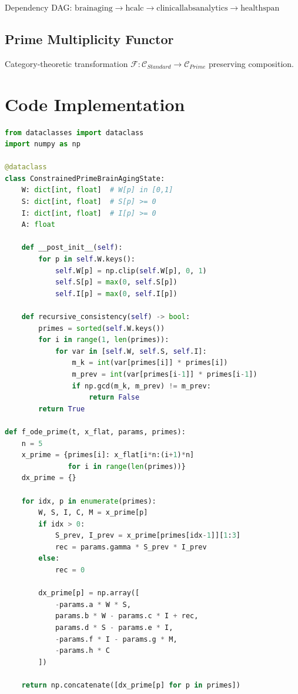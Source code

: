 \documentclass[11pt,letterpaper]{article}
\begin{document}
Dependency DAG: $\text{brainaging} \to \text{hcalc} \to \text{clinicallabsanalytics} \to \text{healthspan}$

\subsection{Prime Multiplicity Functor}

Category-theoretic transformation $\mathcal{F}: \mathcal{C}_{Standard} \to \mathcal{C}_{Prime}$ preserving composition.

\section{Code Implementation}

\begin{lstlisting}[language=Python]
from dataclasses import dataclass
import numpy as np

@dataclass
class ConstrainedPrimeBrainAgingState:
    W: dict[int, float]  # W[p] in [0,1]
    S: dict[int, float]  # S[p] >= 0
    I: dict[int, float]  # I[p] >= 0
    A: float

    def __post_init__(self):
        for p in self.W.keys():
            self.W[p] = np.clip(self.W[p], 0, 1)
            self.S[p] = max(0, self.S[p])
            self.I[p] = max(0, self.I[p])

    def recursive_consistency(self) -> bool:
        primes = sorted(self.W.keys())
        for i in range(1, len(primes)):
            for var in [self.W, self.S, self.I]:
                m_k = int(var[primes[i]] * primes[i])
                m_prev = int(var[primes[i-1]] * primes[i-1])
                if np.gcd(m_k, m_prev) != m_prev:
                    return False
        return True

def f_ode_prime(t, x_flat, params, primes):
    n = 5
    x_prime = {primes[i]: x_flat[i*n:(i+1)*n] 
               for i in range(len(primes))}
    dx_prime = {}

    for idx, p in enumerate(primes):
        W, S, I, C, M = x_prime[p]
        if idx > 0:
            S_prev, I_prev = x_prime[primes[idx-1]][1:3]
            rec = params.gamma * S_prev * I_prev
        else:
            rec = 0

        dx_prime[p] = np.array([
            -params.a * W * S,
            params.b * W - params.c * I + rec,
            params.d * S - params.e * I,
            -params.f * I - params.g * M,
            -params.h * C
        ])

    return np.concatenate([dx_prime[p] for p in primes])
\end{lstlisting}
\end{document}
